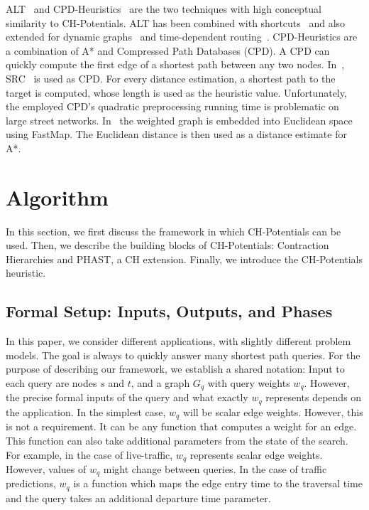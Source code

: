 \documentclass[a4paper,UKenglish,cleveref, autoref, thm-restate]{lipics-v2021}
\begin{document}
ALT~\cite{gh-cspas-05,gw-cppsp-05} and CPD-Heuristics~\cite{DBLP:conf/ijcai/BonoGHS19} are the two techniques with high conceptual similarity to CH-Potentials.
ALT has been combined with shortcuts~\cite{bdsssw-chgds-10} and also extended for dynamic graphs~\cite{dw-lbrdg-07} and time-dependent routing~\cite{ndls-bastd-12,dn-crdtd-12}.
%
CPD-Heuristics are a combination of A* and Compressed Path Databases (CPD).
A CPD can quickly compute the first edge of a shortest path between any two nodes.
In~\cite{DBLP:conf/ijcai/BonoGHS19}, SRC~\cite{DBLP:conf/socs/StrasserHB14} is used as CPD.
For every distance estimation, a shortest path to the target is computed, whose length is used as the heuristic value.
Unfortunately, the employed CPD's quadratic preprocessing running time is problematic on large street networks.
%
%
In~\cite{DBLP:conf/ijcai/0002UJAKK18} the weighted graph is embedded into Euclidean space using FastMap. %
The Euclidean distance is then used as a distance estimate for A*.

\section{Algorithm}\label{sec:main-algo}

In this section, we first discuss the framework in which CH-Potentials can be used.
Then, we describe the building blocks of CH-Potentials: Contraction Hierarchies and PHAST, a CH extension.
Finally, we introduce the CH-Potentials heuristic.

\subsection{Formal Setup: Inputs, Outputs, and Phases}

In this paper, we consider different applications, with slightly different problem models.
The goal is always to quickly answer many shortest path queries.
For the purpose of describing our framework, we establish a shared notation:
Input to each query are nodes $s$ and $t$, and a graph $G_q$ with query weights $w_q$.
However, the precise formal inputs of the query and what exactly $w_q$ represents depends on the application.
In the simplest case, $w_q$ will be scalar edge weights.
However, this is not a requirement.
It can be any function that computes a weight for an edge.
This function can also take additional parameters from the state of the search.
For example, in the case of live-traffic, $w_q$ represents scalar edge weights.
However, values of $w_q$ might change between queries.
In the case of traffic predictions, $w_q$ is a function which maps the edge entry time to the traversal time and the query takes an additional departure time parameter.
\end{document}
